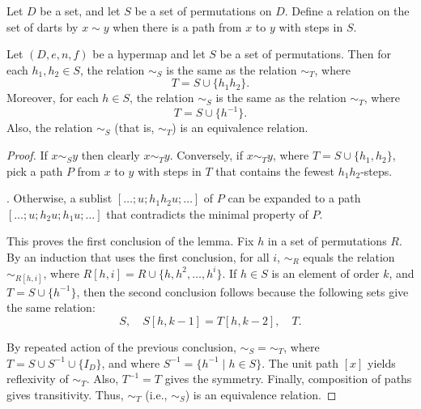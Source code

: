 \begin{definition}[$\sim_S$]
Let $D$ be a set, and let $S$ be a 
set of permutations on $D$.
Define a relation on the set of darts by $x\sim y$ when there is a
path from $x$ to $y$ with steps in $S$.
\end{definition}

\begin{lemma}\label{lemma:er} %
Let $(D,e,n,f)$ be a hypermap and let $S$ be a  set of permutations.
Then for each $h_1,h_2\in S$, 
the relation $\sim_S$ is the same as the relation $\sim_T$, where
\begin{displaymath}
T = S \cup \{h_1h_2\}.
\end{displaymath}
Moreover, for each $h\in S$, 
the relation $\sim_S$ is the same as the relation $\sim_T$, where
\begin{displaymath}
T = S \cup \{h^{-1}\}.
\end{displaymath}
Also,  the relation $\sim_S$ (that is, $\sim_T$) is an equivalence relation.  
%
\end{lemma}

\begin{proof} If $x\sim_S y$ then clearly $x\sim_T y$.  Conversely,
if $x\sim_T y$, where $T = S\cup\{h_1,h_2\}$, pick a path $P$ from $x$ to $y$ with steps
in $T$ that contains the fewest $h_1h_2$-steps.  

.  Otherwise, a sublist $[\ldots;u;h_1h_2u;\ldots]$
of $P$ can be expanded to a path $[\ldots;u;h_2u;h_1u;\ldots]$ that contradicts the minimal
property of $P$.

This proves the first conclusion of the lemma.  Fix $h$ in a set of permutations $R$.
By an induction that uses the first conclusion,  for all $i$, $\sim_R$ equals the relation $\sim_{R[h,i]}$,
where $R[h,i] = R \cup \{h,h^2,\ldots,h^i\}$.  If $h\in S$ is an element of order $k$, 
and $T = S\cup\{h^{-1}\}$, then
the second conclusion follows because the following sets give the same relation:
\begin{displaymath}
S,\quad S[h,k-1] = T[h,k-2],\quad T.
\end{displaymath}

By repeated action of the previous conclusion, $\sim_S=\sim_T$, where 
$T = S\cup S^{-1}\cup \{I_D\}$, and where $S^{-1} = \{h^{-1}\mid h\in S\}$.
The unit path $[x]$ yields reflexivity of $\sim_T$.  Also, $T^{-1} = T$ gives the symmetry.  Finally, composition of paths gives transitivity.  Thus, $\sim_T$ (i.e., $\sim_S$) is an equivalence relation.
\end{proof}

